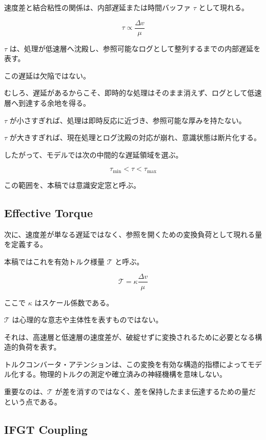 速度差と結合粘性の関係は、内部遅延または時間バッファ $\tau$ として現れる。

\begin{equation}
\tau \propto \frac{\Delta v}{\mu}
\end{equation}

$\tau$ は、処理が低速層へ沈殿し、参照可能なログとして整列するまでの内部遅延を表す。

この遅延は欠陥ではない。

むしろ、遅延があるからこそ、即時的な処理はそのまま消えず、ログとして低速層へ到達する余地を得る。

$\tau$ が小さすぎれば、処理は即時反応に近づき、参照可能な厚みを持たない。

$\tau$ が大きすぎれば、現在処理とログ沈殿の対応が崩れ、意識状態は断片化する。

したがって、モデルでは次の中間的な遅延領域を選ぶ。

\begin{equation}
\tau_{\min} < \tau < \tau_{\max}
\end{equation}

この範囲を、本稿では意識安定窓と呼ぶ。

\subsection{Effective Torque}

次に、速度差が単なる遅延ではなく、参照を開くための変換負荷として現れる量を定義する。

本稿ではこれを有効トルク様量 $\mathcal{T}$ と呼ぶ。

\begin{equation}
\mathcal{T} = \kappa \frac{\Delta v}{\mu}
\end{equation}

ここで $\kappa$ はスケール係数である。

$\mathcal{T}$ は心理的な意志や主体性を表すものではない。

それは、高速層と低速層の速度差が、破綻せずに変換されるために必要となる構造的負荷を表す。

トルクコンバータ・アテンションは、この変換を有効な構造的指標によってモデル化する。物理的トルクの測定や確立済みの神経機構を意味しない。

重要なのは、$\mathcal{T}$ が差を消すのではなく、差を保持したまま伝達するための量だという点である。

\subsection{IFGT Coupling}

